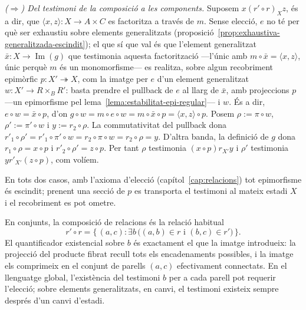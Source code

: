 \begin{prova}
\emph{(\(\Rightarrow\)) Del testimoni de la composició a les components.}
Suposem \(x\mathrel{(r'\circ r)_X}z\), és a dir, que
\(\langle x,z\rangle\colon X\to A\times C\) es factoritza a través de
\(m\). Sense elecció, \(e\) no té per què ser exhaustiu sobre elements
generalitzats (proposició~\ref{prop:exhaustiva-generalitzada-escindit});
el que sí que val és que l'element
generalitzat \(\bar x\colon X\to\operatorname{Im}(g)\) que testimonia
aquesta factorització ---l'únic amb \(m\circ\bar x=\langle x,z\rangle\),
únic perquè \(m\) és un monomorfisme--- es realitza, sobre algun
recobriment epimòrfic \(p\colon X'\twoheadrightarrow X\), com
la imatge per \(e\) d'un element generalitzat
\(w\colon X'\to R\times_B R'\): basta prendre el pullback de \(e\) al
llarg de \(\bar x\), amb projeccions \(p\) ---un epimorfisme pel
lema~\ref{lema:estabilitat-epi-regular}--- i \(w\). És a dir,
\(e\circ w=\bar x\circ p\), d'on
\(g\circ w=m\circ e\circ w=m\circ\bar x\circ p=\langle x,z\rangle\circ
p\). Posem \(\rho:=\pi\circ w\),
\(\rho':=\pi'\circ w\) i \(y:=r_2\circ\rho\). La commutativitat del
pullback dona \(r'_1\circ\rho'=r'_1\circ\pi'\circ w=r_2\circ\pi\circ
w=r_2\circ\rho=y\). D'altra banda, la definició de \(g\) dona
\(r_1\circ\rho=x\circ p\) i \(r'_2\circ\rho'=z\circ p\). Per tant \(\rho\)
testimonia \((x\circ p)\mathrel{r_{X'}}y\) i \(\rho'\) testimonia
\(y\mathrel{r'_{X'}}(z\circ p)\), com volíem.

En tots dos casos, amb l'axioma d'elecció (capítol~\ref{cap:relacions}) tot
epimorfisme és escindit; prenent una secció de \(p\) es transporta el
testimoni al mateix estadi \(X\) i el recobriment es pot ometre.
\end{prova}

\begin{observacio}\label{obs:composicio-relacions-classica}
En conjunts, la composició de relacions és la relació habitual
\[
r'\circ r=\{\,(a,c):\exists b\,\bigl((a,b)\in r\text{ i }(b,c)\in
r'\bigr)\,\}.
\]
El quantificador existencial sobre \(b\) és exactament el que la imatge
introdueix: la projecció del producte fibrat recull tots els encadenaments
possibles, i la imatge els comprimeix en el conjunt de parells
\((a,c)\) efectivament connectats. En el llenguatge global, l'existència
del testimoni \(b\) per a cada parell pot requerir l'elecció; sobre
elements generalitzats, en canvi, el testimoni existeix sempre després
d'un canvi d'estadi.
\end{observacio}

